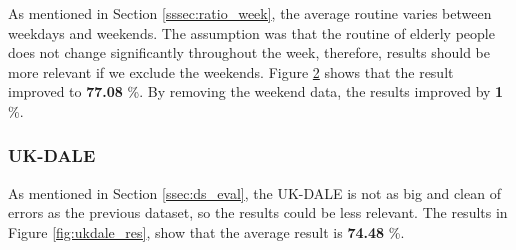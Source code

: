 \begin{figure}[H]
\begin{subfigure}{.5\textwidth}
        \label{fig:refit_res_nw_1}
    \end{subfigure}
\end{figure}

As mentioned in Section \ref{sssec:ratio_week}, the average routine varies between weekdays and weekends.
The assumption was that the routine of elderly people does not change significantly throughout the week, therefore, results should be more relevant if we exclude the weekends.
Figure \ref{fig:refit_res_nw_1} shows that the result improved to \textbf{77.08} \%.
By removing the weekend data, the results improved by \textbf{1} \%.

\subsubsection{UK-DALE}

As mentioned in Section \ref{ssec:ds_eval}, the UK-DALE is not as big and clean of errors as the previous dataset, so the results could be less relevant.
The results in Figure \ref{fig:ukdale_res}, show that the average result is \textbf{74.48} \%.

